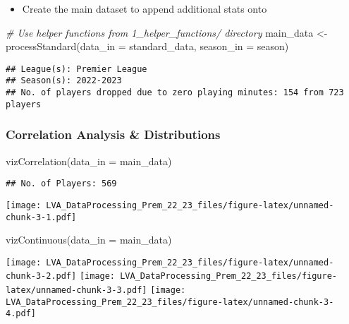 \documentclass[
]{article}
\newenvironment{Shaded}{\begin{snugshade}}{\end{snugshade}}
\newcommand{\AttributeTok}[1]{\textcolor[rgb]{0.77,0.63,0.00}{#1}}
\newcommand{\CommentTok}[1]{\textcolor[rgb]{0.56,0.35,0.01}{\textit{#1}}}
\newcommand{\FunctionTok}[1]{\textcolor[rgb]{0.00,0.00,0.00}{#1}}
\newcommand{\NormalTok}[1]{#1}
\newcommand{\OtherTok}[1]{\textcolor[rgb]{0.56,0.35,0.01}{#1}}
\providecommand{\tightlist}{%
  \setlength{\itemsep}{0pt}\setlength{\parskip}{0pt}}
\begin{document}
\begin{itemize}
\tightlist
\item
  Create the main dataset to append additional stats onto
\end{itemize}

\begin{Shaded}
\begin{Highlighting}[]
\CommentTok{\# Use helper functions from 1\_helper\_functions/ directory}
\NormalTok{main\_data }\OtherTok{\textless{}{-}} \FunctionTok{processStandard}\NormalTok{(}\AttributeTok{data\_in =}\NormalTok{ standard\_data, }\AttributeTok{season\_in =}\NormalTok{ season)}
\end{Highlighting}
\end{Shaded}

\begin{verbatim}
## League(s): Premier League 
## Season(s): 2022-2023 
## No. of players dropped due to zero playing minutes: 154 from 723 players
\end{verbatim}

\hypertarget{correlation-analysis-distributions}{%
\subsubsection{Correlation Analysis \&
Distributions}\label{correlation-analysis-distributions}}

\begin{Shaded}
\begin{Highlighting}[]
\FunctionTok{vizCorrelation}\NormalTok{(}\AttributeTok{data\_in =}\NormalTok{ main\_data)}
\end{Highlighting}
\end{Shaded}

\begin{verbatim}
## No. of Players: 569
\end{verbatim}

\texttt{[image: LVA\_DataProcessing\_Prem\_22\_23\_files/figure-latex/unnamed-chunk-3-1.pdf]}

\begin{Shaded}
\begin{Highlighting}[]
\FunctionTok{vizContinuous}\NormalTok{(}\AttributeTok{data\_in =}\NormalTok{ main\_data)}
\end{Highlighting}
\end{Shaded}

\texttt{[image: LVA\_DataProcessing\_Prem\_22\_23\_files/figure-latex/unnamed-chunk-3-2.pdf]}
\texttt{[image: LVA\_DataProcessing\_Prem\_22\_23\_files/figure-latex/unnamed-chunk-3-3.pdf]}
\texttt{[image: LVA\_DataProcessing\_Prem\_22\_23\_files/figure-latex/unnamed-chunk-3-4.pdf]}
\newpage
\end{document}
